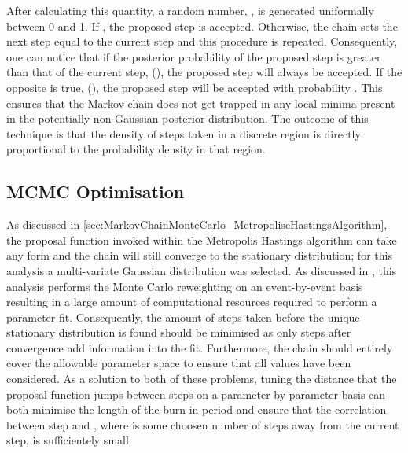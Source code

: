 After calculating this quantity, a random number, \quickmath{\beta}, is generated uniformally between 0 and 1. If , the proposed step is accepted. Otherwise, the chain sets the next step equal to the current step and this procedure is repeated. Consequently, one can notice that if the posterior probability of the proposed step is greater than that of the current step, (), the proposed step will always be accepted. If the opposite is true, (), the proposed step will be accepted with probability . This ensures that the Markov chain does not get trapped in any local minima present in the potentially non-Gaussian posterior distribution. The outcome of this technique is that the density of steps taken in a discrete region is directly proportional to the probability density in that region.

\subsection{MCMC Optimisation}
\label{sec:MarkovChainMonteCarlo_MCMCOptimisation}
As discussed in \autoref{sec:MarkovChainMonteCarlo_MetropoliseHastingsAlgorithm}, the proposal function invoked within the Metropolis Hastings algorithm can take any form and the chain will still converge to the stationary distribution; for this analysis a multi-variate Gaussian distribution was selected. As discussed in , this analysis performs the Monte Carlo reweighting on an event-by-event basis resulting in a large amount of computational resources required to perform a parameter fit. Consequently, the amount of steps taken before the unique stationary distribution is found should be minimised as only steps after convergence add information into the fit. Furthermore, the chain should entirely cover the allowable parameter space to ensure that all values have been considered. As a solution to both of these problems, tuning the distance that the proposal function jumps between steps on a parameter-by-parameter basis can both minimise the length of the burn-in period and ensure that the correlation between step  and , where  is some choosen number of steps away from the current step, is sufficientely small.

